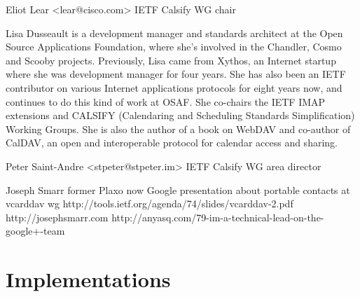 \documentclass[12pt,a4paper]{scrartcl}		%
\begin{document}
Eliot Lear <lear@cisco.com>
  IETF Calsify WG chair

Lisa Dusseault is a development manager and standards architect at the Open Source Applications Foundation, where she's involved in the Chandler, Cosmo and Scooby projects. Previously, Lisa came from Xythos, an Internet startup where she was development manager for four years. She has also been an IETF contributor on various Internet applications protocols for eight years now, and continues to do this kind of work at OSAF. She co-chairs the IETF IMAP extensions and CALSIFY (Calendaring and Scheduling Standards Simplification) Working Groups. She is also the author of a book on WebDAV and co-author of CalDAV, an open and interoperable protocol for calendar access and sharing. 

Peter Saint-Andre <stpeter@stpeter.im>
  IETF Calsify WG area director

Joseph Smarr
  former Plaxo now Google
  presentation about portable contacts at vcarddav wg http://tools.ietf.org/agenda/74/slides/vcarddav-2.pdf
  http://josephsmarr.com
  http://anyasq.com/79-im-a-technical-lead-on-the-google+-team

\section{Implementations}



{}

\end{document}

